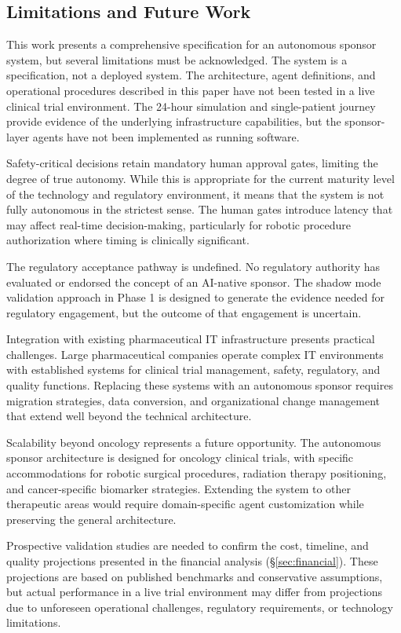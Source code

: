 \subsection{Limitations and Future Work}

This work presents a comprehensive specification for an autonomous sponsor system, but
several limitations must be acknowledged. The system is a specification, not a deployed
system. The architecture, agent definitions, and operational procedures described in this
paper have not been tested in a live clinical trial environment. The 24-hour simulation
\cite{main-repo} and single-patient journey \cite{patient-journey-paper} provide evidence
of the underlying infrastructure capabilities, but the sponsor-layer agents have not been
implemented as running software.

Safety-critical decisions retain mandatory human approval gates, limiting the degree of
true autonomy. While this is appropriate for the current maturity level of the technology
and regulatory environment, it means that the system is not fully autonomous in the
strictest sense. The human gates introduce latency that may affect real-time decision-making,
particularly for robotic procedure authorization where timing is clinically significant.

The regulatory acceptance pathway is undefined. No regulatory authority has evaluated or
endorsed the concept of an AI-native sponsor. The shadow mode validation approach in
Phase 1 is designed to generate the evidence needed for regulatory engagement, but the
outcome of that engagement is uncertain.

Integration with existing pharmaceutical IT infrastructure presents practical challenges.
Large pharmaceutical companies operate complex IT environments with established systems
for clinical trial management, safety, regulatory, and quality functions. Replacing these
systems with an autonomous sponsor requires migration strategies, data conversion, and
organizational change management that extend well beyond the technical architecture.

Scalability beyond oncology represents a future opportunity. The autonomous sponsor
architecture is designed for oncology clinical trials, with specific accommodations for
robotic surgical procedures, radiation therapy positioning, and cancer-specific biomarker
strategies. Extending the system to other therapeutic areas would require domain-specific
agent customization while preserving the general architecture.

Prospective validation studies are needed to confirm the cost, timeline, and quality
projections presented in the financial analysis (\S\ref{sec:financial}). These projections
are based on published benchmarks and conservative assumptions, but actual performance in
a live trial environment may differ from projections due to unforeseen operational
challenges, regulatory requirements, or technology limitations.
